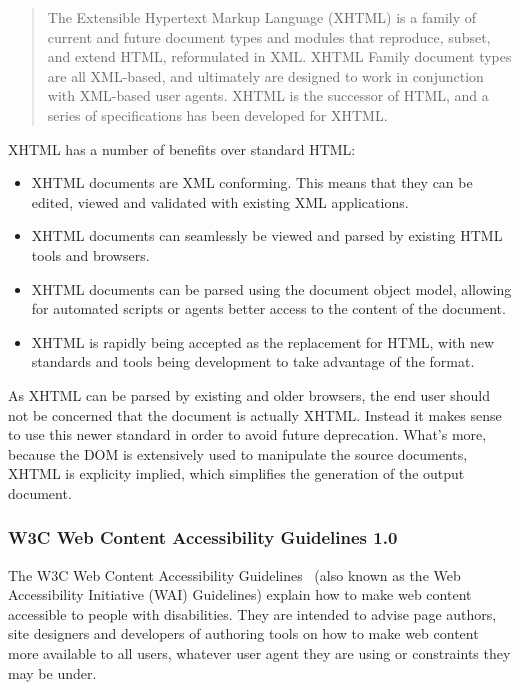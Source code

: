\begin{quotation}

The Extensible Hypertext Markup Language (XHTML) is a family of current and
future document types and modules that reproduce, subset, and extend HTML,
reformulated in XML. XHTML Family document types are all XML-based, and
ultimately are designed to work in conjunction with XML-based user agents.
XHTML is the successor of HTML, and a series of specifications has been
developed for XHTML.

\end{quotation}

XHTML has a number of benefits over standard HTML:

\begin{itemize}

\item XHTML documents are XML conforming. This means that they can be edited,
viewed and validated with existing XML applications.

\item XHTML documents can seamlessly be viewed and parsed by existing HTML
tools and browsers.

\item XHTML documents can be parsed using the document object model, allowing
for automated scripts or agents better access to the content of the document.

\item XHTML is rapidly being accepted as the replacement for HTML, with new
standards and tools being development to take advantage of the format.

\end{itemize}

As XHTML can be parsed by existing and older browsers, the end user should not
be concerned that the document is actually XHTML. Instead it makes sense to use
this newer standard in order to avoid future deprecation. What's more, because
the DOM is extensively used to manipulate the source documents, XHTML is
explicity implied, which simplifies the generation of the output document.

\subsubsection{W3C Web Content Accessibility Guidelines 1.0}

The W3C Web Content Accessibility Guidelines~\cite{w3c:wcag} (also known as the
Web Accessibility Initiative (WAI) Guidelines) explain how to make web content
accessible to people with disabilities. They are intended to advise page
authors, site designers and developers of authoring tools on how to make web
content more available to all users, whatever user agent they are using or
constraints they may be under. 

